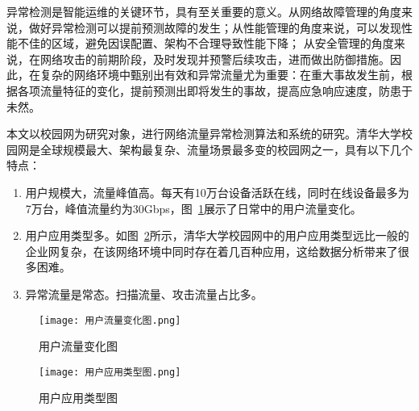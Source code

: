 异常检测是智能运维的关键环节，具有至关重要的意义。从网络故障管理的角度来说，做好异常检测可以提前预测故障的发生；从性能管理的角度来说，可以发现性能不佳的区域，避免因误配置、架构不合理导致性能下降；
从安全管理的角度来说，在网络攻击的前期阶段，及时发现并预警后续攻击，进而做出防御措施。因此，在复杂的网络环境中甄别出有效和异常流量尤为重要：在重大事故发生前，根据各项流量特征的变化，提前预测出即将发生的事故，提高应急响应速度，防患于未然。


本文以校园网为研究对象，进行网络流量异常检测算法和系统的研究。清华大学校园网是全球规模最大、架构最复杂、流量场景最多变的校园网之一，具有以下几个特点：
\begin{enumerate}
    \item 用户规模大，流量峰值高。每天有10万台设备活跃在线，同时在线设备最多为7万台，峰值流量约为30Gbps，图~\ref{fig:用户流量变化图}展示了日常中的用户流量变化。
    \item	用户应用类型多。如图~\ref{fig:用户应用类型图}所示，清华大学校园网中的用户应用类型远比一般的企业网复杂，在该网络环境中同时存在着几百种应用，这给数据分析带来了很多困难。
    \item	异常流量是常态。扫描流量、攻击流量占比多。
\end{enumerate}

\begin{figure}
  \centering
  \texttt{[image: 用户流量变化图.png]}
  \caption{用户流量变化图}
  \label{fig:用户流量变化图}
\end{figure}

\begin{figure}
  \centering
  \texttt{[image: 用户应用类型图.png]}
  \caption{用户应用类型图}
  \label{fig:用户应用类型图}
\end{figure}



